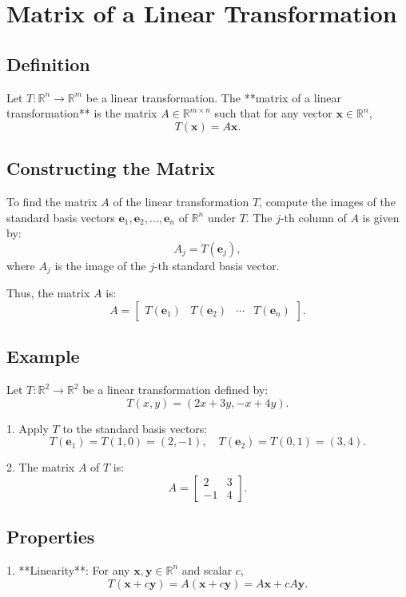\documentclass{article}
\begin{document}
\section*{Matrix of a Linear Transformation}

\subsection*{Definition}
Let \( T: \mathbb{R}^n \to \mathbb{R}^m \) be a linear transformation. The **matrix of a linear transformation** is the matrix \( A \in \mathbb{R}^{m \times n} \) such that for any vector \( \mathbf{x} \in \mathbb{R}^n \),
\[
T(\mathbf{x}) = A\mathbf{x}.
\]

\subsection*{Constructing the Matrix}
To find the matrix \( A \) of the linear transformation \( T \), compute the images of the standard basis vectors \( \mathbf{e}_1, \mathbf{e}_2, \dots, \mathbf{e}_n \) of \( \mathbb{R}^n \) under \( T \). The \( j\)-th column of \( A \) is given by:
\[
A_j = T(\mathbf{e}_j),
\]
where \( A_j \) is the image of the \( j \)-th standard basis vector.

Thus, the matrix \( A \) is:
\[
A = \begin{bmatrix}
T(\mathbf{e}_1) & T(\mathbf{e}_2) & \cdots & T(\mathbf{e}_n)
\end{bmatrix}.
\]

\subsection*{Example}
Let \( T: \mathbb{R}^2 \to \mathbb{R}^2 \) be a linear transformation defined by:
\[
T(x, y) = (2x + 3y, -x + 4y).
\]

1. Apply \( T \) to the standard basis vectors:
\[
T(\mathbf{e}_1) = T(1, 0) = (2, -1), \quad T(\mathbf{e}_2) = T(0, 1) = (3, 4).
\]

2. The matrix \( A \) of \( T \) is:
\[
A = \begin{bmatrix}
2 & 3 \\
-1 & 4
\end{bmatrix}.
\]

\subsection*{Properties}
1. **Linearity**: For any \( \mathbf{x}, \mathbf{y} \in \mathbb{R}^n \) and scalar \( c \),
\[
T(\mathbf{x} + c\mathbf{y}) = A(\mathbf{x} + c\mathbf{y}) = A\mathbf{x} + cA\mathbf{y}.
\]
\end{document}
